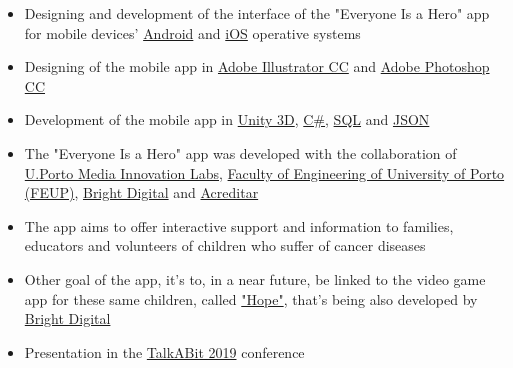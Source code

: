\documentclass[10pt,a4paper,academicons]{altacv}
\begin{document}
\divider

\clearpage


\begin{itemize}
\item Designing and development of the interface of the "Everyone Is a Hero" app for mobile devices' \href{https://www.android.com/}{Android} and \href{https://www.apple.com/ios/ios-12/}{iOS} operative systems
\item Designing of the mobile app in \href{https://www.adobe.com/products/illustrator.html}{Adobe Illustrator CC} and \href{https://www.adobe.com/products/photoshop.html}{Adobe Photoshop CC}
\item Development of the mobile app in \href{https://unity3d.com/}{Unity 3D}, \href{https://en.wikipedia.org/wiki/C_Sharp_(programming_language)}{C\#}, \href{https://en.wikipedia.org/wiki/SQL}{SQL} and \href{https://www.json.org/}{JSON}
\item The "Everyone Is a Hero" app was developed with the collaboration of \href{https://mil.up.pt/}{U.Porto Media Innovation Labs}, \href{https://sigarra.up.pt/feup/pt/web_page.inicial}{Faculty of Engineering of University of Porto (FEUP)}, \href{https://www.bright.pt/}{Bright Digital} and \href{http://www.acreditar.org.pt/}{Acreditar}
\item The app aims to offer interactive support and information to families, educators and volunteers of children who suffer of cancer diseases
\item Other goal of the app, it's to, in a near future, be linked to the video game app for these same children, called \href{https://www.publico.pt/2018/05/22/p3/noticia/o-mundo-e-muito-pequeno-para-hernani-o-investigador-que-quer-descodificar-a-saude-1834877}{"Hope"}, that's being also developed by \href{https://www.bright.pt/}{Bright Digital}
\item Presentation in the \href{http://talkabit.org/}{TalkABit 2019} conference
\end{itemize}
\end{document}
